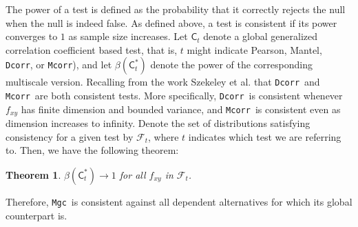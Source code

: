\documentclass[11pt]{article}
\newcommand{\note}[2][]{\added[#1,remark={#2}]{}}
\providecommand{\sct}[1]{{\sc \texttt{#1}}}
\providecommand{\mc}[1]{\mathcal{#1}}
\newcommand{\G}{\mathsf{C}}
\newcommand{\Mgc}{\sct{Mgc}}
\newcommand{\Dcorr}{\sct{Dcorr}}
\newcommand{\Mcorr}{\sct{Mcorr}}
\newcommand{\cs}[1]{{\note{cs: #1}}}
\newtheorem{thm}{Theorem}
\begin{document}
The power of a test is defined as the probability that it correctly rejects the null when the null is indeed false.  As defined above, a test is consistent if its power converges to $1$ as sample size increases.  
Let $\G_t$ denote a global generalized correlation coefficient based test, that is, $t$ might indicate Pearson, Mantel, \Dcorr, or \Mcorr), and let $\beta(\G_t^*)$ denote the power of the corresponding multiscale version.  
Recalling from the work Szekeley et al. that \Dcorr~and \Mcorr~are both consistent tests. More specifically, \Dcorr~is consistent whenever $f_{xy}$ has finite dimension and bounded variance, and \Mcorr~is consistent even as dimension increases to infinity.  Denote the set of distributions satisfying consistency for a given test by $\mc{F}_t$, where $t$ indicates which test we are referring to. Then, we have the following theorem:
\begin{thm}
\label{thm1}
$\beta(\G_t^*) \rightarrow 1$ for all $f_{xy}$ in $\mc{F}_t$.
\end{thm}

Therefore, \Mgc~is consistent against all dependent alternatives for which its global counterpart is.

\end{document}
